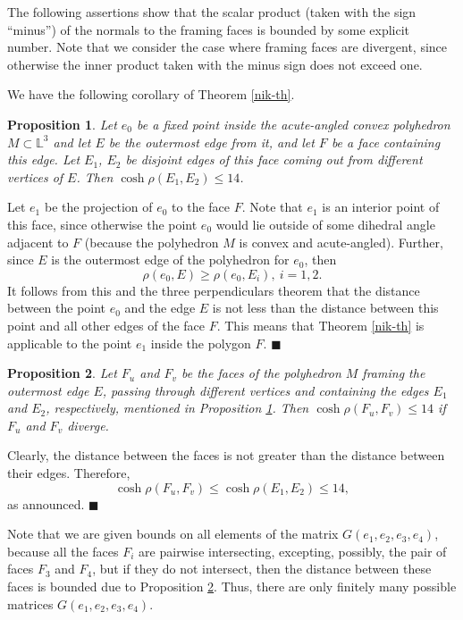 \documentclass[14pt]{article}
\newtheorem{proposition}{\indent Proposition}[section]
\newenvironment{proof}                    
       {\par\indent{\bf Proof. }} 
	        {\hfill $\scriptstyle\blacksquare$}
\begin{document}
The following assertions show that the scalar product (taken with the
sign ``minus'') of the normals to the framing faces is bounded by some explicit number.
Note that we consider the case where  framing
faces are divergent, since otherwise the inner product taken
with the minus sign does not exceed one.

We have the following corollary of Theorem \ref{nik-th}.

\begin{proposition} \label{ud-rebro}
Let $e_0$ be a fixed point inside the acute-angled convex polyhedron
$M \subset \mathbb{L}^3$ and let $E$ be the outermost edge from it, and let $F$
be a face
containing this edge.
Let $E_1$, $E_2$ be disjoint edges of this face coming out from
different vertices of $E$. Then $ \cosh \rho (E_1, E_2) \le 14$.
\end{proposition}
\begin{proof}
Let $e_1$ be the projection of $e_0$ to the face $F$. Note that $e_1$
is an interior point of this face, since otherwise  the point
$e_0$ would lie outside of some dihedral angle adjacent to  $F$
(because the polyhedron $M$ is convex and acute-angled).
Further, since $E$ is
the outermost edge of the polyhedron for $e_0$, then
$$\rho (e_0, E) \ge \rho (e_0, E_i), \ i = 1, 2.$$
It follows from this and  the three
perpendiculars theorem  that the distance between the point $e_0$
and the edge $E$ is not
less than the distance between this point and all other edges of the face $F$.
This means that Theorem \ref{nik-th} is applicable to the point $e_1$
inside the polygon $F$.
\end{proof}

\begin{proposition}\label{sledstvie-rasst}
Let $F_u$ and $F_v$ be the faces of the polyhedron $M$ framing the
outermost edge $E$, passing through different vertices and containing the edges  $E_1$
 and $E_2$, respectively, mentioned in
Proposition \ref{ud-rebro}. Then $\cosh \rho (F_u, F_v) \le 14$ if  $F_u$
and $F_v$ diverge.
\end{proposition}
\begin{proof}
Clearly, the distance between the faces is not greater than the distance
between their edges.
Therefore,
$$
\cosh \rho (F_u, F_v) \le \cosh \rho (E_1, E_2) \le 14,
$$
as announced.
\end{proof}

Note that we are given bounds
on all elements of the matrix $G(e_1, e_2, e_3, e_4)$,
because all the faces $F_i$ are pairwise intersecting, excepting,
possibly, the pair of faces $F_3$ and $F_4$, but if they do not intersect,
then the distance between
these faces is bounded due to Proposition \ref{sledstvie-rasst}.
Thus, there are only finitely many possible matrices
$G(e_1, e_2, e_3, e_4)$.
\end{document}
